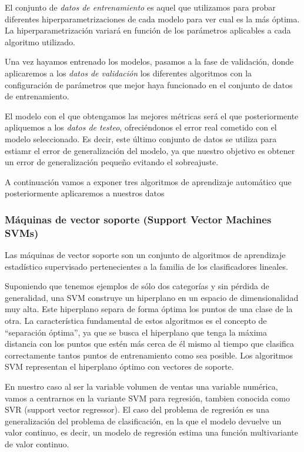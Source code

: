 \documentclass[12pt,a4paper,]{book}
\numberwithin{dummy}{section}
\theoremstyle{ocrenumbox}
\theoremstyle{blacknumex}
\theoremstyle{blacknumbox}
\theoremstyle{ocrenum}
\theoremstyle{ocrenum}
\begin{document}
El conjunto de \emph{datos de entrenamiento} es aquel que utilizamos
para probar diferentes hiperparametrizaciones de cada modelo para ver
cual es la más óptima. La hiperparametrización variará en función de los
parámetros aplicables a cada algoritmo utilizado.

Una vez hayamos entrenado los modelos, pasamos a la fase de validación,
donde aplicaremos a los \emph{datos de validación} los diferentes
algoritmos con la configuración de parámetros que mejor haya funcionado
en el conjunto de datos de entrenamiento.

El modelo con el que obtengamos las mejores métricas será el que
posteriormente apliquemos a los \emph{datos de testeo}, ofreciéndonos el
error real cometido con el modelo seleccionado. Es decir, este último
conjunto de datos se utiliza para estiamr el error de generalización del
modelo, ya que nuestro objetivo es obtener un error de generalización
pequeño evitando el sobreajuste.

A continuación vamos a exponer tres algoritmos de aprendizaje automático
que posteriormente aplicaremos a nuestros datos

\hypertarget{muxe1quinas-de-vector-soporte-support-vector-machines-svms}{%
\subsubsection{Máquinas de vector soporte (Support Vector Machines
SVMs)}\label{muxe1quinas-de-vector-soporte-support-vector-machines-svms}}

Las máquinas de vector soporte son un conjunto de algoritmos de
aprendizaje estadístico supervisado pertenecientes a la familia de los
clasificadores lineales.

Suponiendo que tenemos ejemplos de sólo dos categorías y sin pérdida de
generalidad, una SVM construye un hiperplano en un espacio de
dimensionalidad muy alta. Este hiperplano separa de forma óptima los
puntos de una clase de la otra. La característica fundamental de estos
algoritmos es el concepto de ``separación óptima'', ya que se busca el
hiperplano que tenga la máxima distancia con los puntos que estén más
cerca de él mismo al tiempo que clasifica correctamente tantos puntos de
entrenamiento como sea posible. Los algoritmos SVM representan el
hiperplano óptimo con vectores de soporte.

En nuestro caso al ser la variable volumen de ventas una variable
numérica, vamos a centrarnos en la variante SVM para regresión, tambien
conocida como SVR (support vector regressor). El caso del problema de
regresión es una generalización del problema de clasificación, en la que
el modelo devuelve un valor continuo, es decir, un modelo de regresión
estima una función multivariante de valor continuo.
\end{document}
